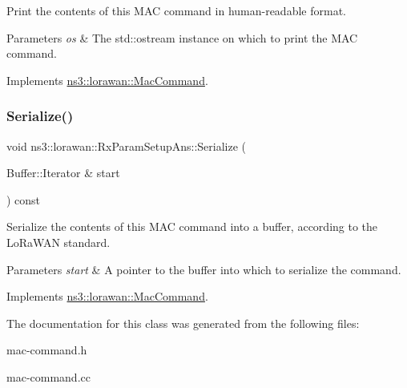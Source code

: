 Print the contents of this M\+AC command in human-\/readable format.


\begin{DoxyParams}{Parameters}
{\em os} & The std\+::ostream instance on which to print the M\+AC command. \\
\hline
\end{DoxyParams}


Implements \hyperlink{classns3_1_1lorawan_1_1MacCommand_a6bf88db38dab7dcd817811a9fb59f920}{ns3\+::lorawan\+::\+Mac\+Command}.

\mbox{\label{classns3_1_1lorawan_1_1RxParamSetupAns_af6250c20e44bc56a75d6b5cd9fdcbf0d}} 
\subsubsection{\texorpdfstring{Serialize()}{Serialize()}}
{\footnotesize\ttfamily void ns3\+::lorawan\+::\+Rx\+Param\+Setup\+Ans\+::\+Serialize (\begin{DoxyParamCaption}\item[{Buffer\+::\+Iterator \&}]{start }\end{DoxyParamCaption}) const\hspace{0.3cm}{\ttfamily [virtual]}}

Serialize the contents of this M\+AC command into a buffer, according to the Lo\+Ra\+W\+AN standard.


\begin{DoxyParams}{Parameters}
{\em start} & A pointer to the buffer into which to serialize the command. \\
\hline
\end{DoxyParams}


Implements \hyperlink{classns3_1_1lorawan_1_1MacCommand_a0ed44b33942ddc3dc9694dc06ab0b87f}{ns3\+::lorawan\+::\+Mac\+Command}.



The documentation for this class was generated from the following files\+:\begin{DoxyCompactItemize}
\item 
mac-\/command.\+h\item 
mac-\/command.\+cc\end{DoxyCompactItemize}
